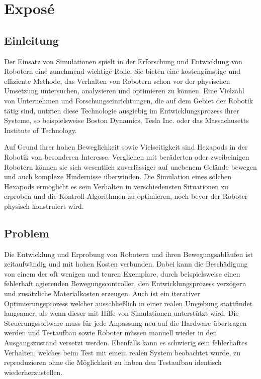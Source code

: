 \chapter{Exposé}
\label{ch:expose}



\section{Einleitung}
Der Einsatz von Simulationen spielt in der Erforschung und Entwicklung von Robotern eine zunehmend wichtige Rolle\cite{afzal2020study}. 
Sie bieten eine kostengünstige und effiziente Methode, das Verhalten von Robotern schon vor der physischen Umsetzung untersuchen, analysieren und optimieren zu können. 
Eine Vielzahl von Unternehmen und Forschungseinrichtungen, die auf dem Gebiet der Robotik tätig sind, nutzten diese Technologie ausgiebig im Entwicklungsprozess ihrer Systeme, so beispielsweise Boston Dynamics\cite{BostonDynamicsSimulation}, Tesla Inc.\cite{TeslaAiDay2022} oder das Massachusetts Institute of Technology.

Auf Grund ihrer hohen Beweglichkeit sowie Vielseitigkeit sind Hexapods in der Robotik von besonderen Interesse. 
Verglichen mit beräderten oder zweibeinigen Robotern können sie sich wesentlich zuverlässiger auf unebenem Gelände bewegen und auch komplexe Hindernisse überwinden.
Die Simulation eines solchen Hexapods ermöglicht es sein Verhalten in verschiedensten Situationen zu erproben und die Kontroll-Algorithmen zu optimieren, noch bevor der Roboter physisch konstruiert wird.

\section{Problem}

Die Entwicklung und Erprobung von Robotern und ihren Bewegungsabläufen ist zeitaufwändig und mit hohen Kosten verbunden.
Dabei kann die Beschädigung von einem der oft wenigen und teuren Exemplare, durch beispielsweise einen fehlerhaft agierenden Bewegungscontroller, den Entwicklungsprozess verzögern und zusätzliche Materialkosten erzeugen.
Auch ist ein iterativer Optimierungsprozess welcher ausschließlich in einer realen Umgebung stattfindet langsamer, als wenn dieser mit Hilfe von Simulationen unterstützt wird.
Die Steuerungssoftware muss für jede Anpassung neu auf die Hardware übertragen werden und Testaufbau sowie Roboter müssen manuell wieder in den Ausgangszustand versetzt werden.
Ebenfalls kann es schwierig sein fehlerhaftes Verhalten, welches beim Test mit einem realen System beobachtet wurde, zu reproduzieren ohne die Möglichkeit zu haben den Testaufbau identisch wiederherzustellen.

